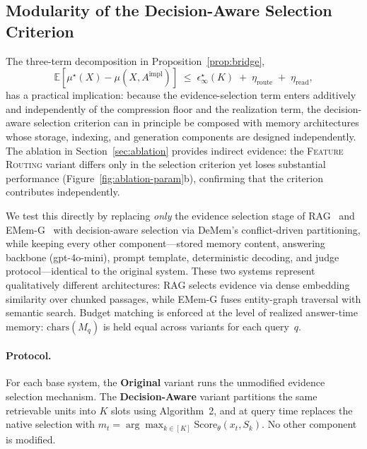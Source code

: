\documentclass{article}
\theoremstyle{plain}
\theoremstyle{definition}
\theoremstyle{remark}
\begin{document}
\subsection{Modularity of the Decision-Aware Selection Criterion}
\label{app:modularity}

The three-term decomposition in Proposition~\ref{prop:bridge},
\[
  \mathbb{E}[\mu^\star(X) - \mu(X, A^{\mathrm{impl}})]
  \;\leq\;
  \epsilon^\star_\infty(K)
  \;+\; \eta_{\mathrm{route}}
  \;+\; \eta_{\mathrm{read}},
\]
has a practical implication: because the evidence-selection term enters
additively and independently of the compression floor and the realization
term, the decision-aware selection criterion can in principle be composed
with memory architectures whose storage, indexing, and generation
components are designed independently.
The ablation in Section~\ref{sec:ablation} provides indirect evidence:
the \textsc{Feature Routing} variant differs only in the selection
criterion yet loses substantial performance
(Figure~\ref{fig:ablation-param}b), confirming that the criterion
contributes independently.

We test this directly by replacing \emph{only} the evidence selection
stage of
RAG~\citep{lewis2021retrievalaugmentedgenerationknowledgeintensivenlp}
and
EMem-G~\citep{zhou2025simplestrongbaselinelongterm} with decision-aware
selection via DeMem's conflict-driven partitioning, while
keeping every other component---stored memory content, answering backbone
(gpt-4o-mini), prompt template, deterministic decoding, and judge
protocol---identical to the original system.
These two systems represent qualitatively different architectures: RAG
selects evidence via dense embedding similarity over chunked passages,
while EMem-G fuses entity-graph traversal with semantic search.
Budget matching is enforced at the level of realized answer-time memory:
$\mathrm{chars}(M_q)$ is held equal across variants for each query~$q$.

\paragraph{Protocol.}
For each base system, the \textbf{Original} variant runs the unmodified
evidence selection mechanism.
The \textbf{Decision-Aware} variant partitions the same retrievable
units into $K$ slots using Algorithm~2, and at query time replaces the
native selection with
$m_t = \arg\max_{k \in [K]} \mathrm{Score}_\theta(x_t, S_k)$.
No other component is modified.
\end{document}
